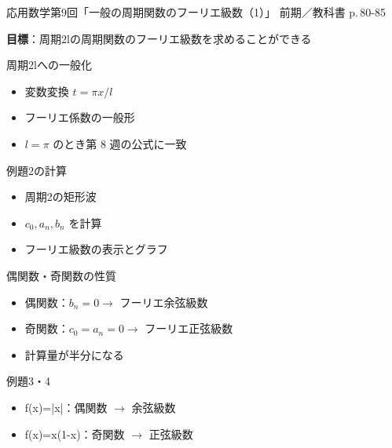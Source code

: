 \documentclass[aspectratio=43,professionalfonts,handout]{beamer}
\newcommand{\LectureNum}{9}
\newcommand{\LectureTitle}{一般の周期関数のフーリエ級数（1）}
\newcommand{\TextPages}{p.\,80-85}
\newcommand{\CourseName}{応用数学}
\renewcommand{\TermName}{前期}
\begin{document}
\begin{frame}{\CourseName\quad 第\LectureNum 回「\LectureTitle」}
  {\small \TermName\quad \TeacherName\quad ／\quad 教科書 \TextPages}

  \textbf{目標}：周期2lの周期関数のフーリエ級数を求めることができる

\end{frame}

\begin{frame}{周期2lへの一般化}
  \begin{block}{}
  \begin{itemize}
    \item 変数変換 $t = \pi x/l$
    \item フーリエ係数の一般形
    \item $l=\pi$ のとき第 8 週の公式に一致
  \end{itemize}
  \end{block}
\end{frame}

\begin{frame}{例題2の計算}
  \begin{block}{}
  \begin{itemize}
    \item 周期2の矩形波
    \item $c_{0}, a_{n}, b_{n}$ を計算
    \item フーリエ級数の表示とグラフ
  \end{itemize}
  \end{block}
\end{frame}

\begin{frame}{偶関数・奇関数の性質}
  \begin{block}{}
  \begin{itemize}
    \item 偶関数：$b_{n}=0 \to $ フーリエ余弦級数
    \item 奇関数：$c_{0}=a_{n}=0 \to $ フーリエ正弦級数
    \item 計算量が半分になる
  \end{itemize}
  \end{block}
\end{frame}

\begin{frame}{例題3・4}
  \begin{block}{}
  \begin{itemize}
    \item f(x)=|x|：偶関数  $\to$  余弦級数
    \item f(x)=x(1-x)：奇関数  $\to$  正弦級数
  \end{itemize}
  \end{block}
\end{frame}
\end{document}
